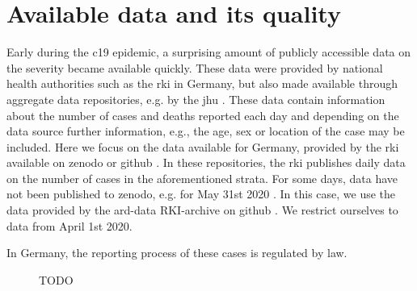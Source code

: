 \section{Available data and its quality}
\label{sec:data}

Early during the \acrshort{c19} epidemic, a surprising amount of publicly accessible data on the severity became available quickly. These data were provided by national health authorities such as the \acrfull{rki} in Germany, but also made available through aggregate data repositories, e.g. by the \acrfull{jhu} \citep{Dong2020Interactive}. These data contain information about the number of cases and deaths reported each day and depending on the data source further information, e.g., the age, sex or location of the case may be included. Here we focus on the data available for Germany, provided by the \acrshort{rki} available on zenodo \citep{RobertKoch-Institut2024SARSCoV2} or github \citep{RobertKoch-Institut2024SARSCoV2a}. In these repositories, the \acrshort{rki} publishes daily data on the number of cases in the aforementioned strata. For some days, data have not been published to zenodo, e.g. for May 31st 2020 . In this case, we use the data provided by the ard-data RKI-archive on github \citep{MichaelKreil2022RKICoronaDatenArchiv}. We restrict ourselves to data from April 1st 2020.

In Germany, the reporting process of these cases is regulated by law. 


\begin{figure}
    \resizebox{\textwidth}{!}{%
    }
    \caption{TODO}
    \label{fig:cases_germany}
\end{figure}

